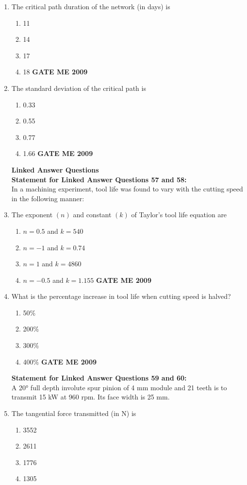 \documentclass[journal]{IEEEtran}
\begin{document}
\begin{enumerate}[leftmargin=0pt]
\item The critical path duration of the network (in days) is
\begin{enumerate}[label=(\Alph*)]
  \item 11
  \item 14
  \item 17
  \item 18
\hfill{\textbf{GATE ME 2009}}
\end{enumerate}
\item The standard deviation of the critical path is
\begin{enumerate}[label=(\Alph*)]
  \item 0.33
  \item 0.55
  \item 0.77
  \item 1.66
\hfill{\textbf{GATE ME 2009}}
\end{enumerate}
\newpage
\textbf{Linked Answer Questions}\\
\textbf{Statement for Linked Answer Questions 57 and 58:}\\
In a machining experiment, tool life was found to vary with the cutting speed in the following manner:
\begin{table}[h]
    \centering
    
   
\end{table}

\item The exponent $(n)$ and constant $(k)$ of Taylor's tool life equation are
\begin{enumerate}[label=(\Alph*)]
  \item $n=0.5$ and $k=540$
  \item $n=-1$ and $k=0.74$
  \item $n=1$ and $k=4860$
  \item $n=-0.5$ and $k=1.155$
\hfill{\textbf{GATE ME 2009}}
\end{enumerate}

\item What is the percentage increase in tool life when cutting speed is halved?
\begin{enumerate}[label=(\Alph*)]
  \item 50\%
  \item 200\%
  \item 300\%
  \item 400\%
\hfill{\textbf{GATE ME 2009}}
\end{enumerate}

\textbf{Statement for Linked Answer Questions 59 and 60:}\\
A 20° full depth involute spur pinion of 4 mm module and 21 teeth is to transmit 15 kW at 960 rpm. Its face width is 25 mm.
\item The tangential force transmitted (in N) is
\begin{enumerate}[label=(\Alph*)]
  \item 3552
  \item 2611
  \item 1776
  \item 1305
\end{enumerate}


\end{enumerate}
\end{document}

